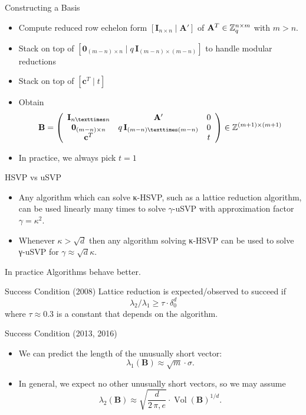 \documentclass[presentation,smaller]{beamer}
\renewcommand{\vec}[1]{\mathbf{#1}\xspace}
\DeclareMathOperator{\Vol}{Vol}
\begin{document}
\begin{frame}[label={sec:org4e52b51}]{Constructing a Basis}
\begin{itemize}
\item Compute reduced row echelon form \([\vec{I}_{n × n} \mid \vec{A}']\) of \(\vec{A}^T \in \ZZ_q^{n \times m}\) with \(m>n\).
\item Stack on top of \([\vec{0}_{(m-n) \times n} \mid q\,\vec{I}_{(m-n) × (m-n)}]\) to handle modular reductions
\item Stack on top of \([\vec{c}^T \mid t]\)
\item Obtain \[\vec{B}=\left(\begin{array}{ccc}
         \vec{I}_{n × n} & \vec{A}' &  0 \\
         \vec{0}_{(m-n) \times n} & q\,\vec{I}_{(m-n) × (m-n)} & 0\\
          \vec{c}^T  & & t \\
        \end{array} \right) \in \ZZ^{(m+1) \times (m+1)}\]
\item In practice, we always pick \(t=1\)
\end{itemize}
\end{frame}

\begin{frame}[label={sec:org14b043e}]{HSVP vs uSVP}
\begin{itemize}
\item Any algorithm which can solve κ-HSVP, such as a lattice reduction algorithm, can be used linearly many times to solve \(γ\)-uSVP with approximation factor \(γ=κ^2\).
\item Whenever \(κ > \sqrt{d}\) then any algorithm solving κ-HSVP can be used to solve γ-uSVP for \(γ ≈ \sqrt{d} κ\).
\end{itemize}

\pause

\begin{block}{In practice}
Algorithms behave better.
\end{block}
\end{frame}

\begin{frame}[label={sec:org9b3eedf}]{Success Condition (2008)}
Lattice reduction is expected/observed  to succeed if \[λ_2/λ_1 ≥ τ ⋅ δ_0^d\] where \(τ ≈ 0.3\) is a constant that depends on the algorithm.
\end{frame}

\begin{frame}[label={sec:org145ae5c}]{Success Condition (2013, 2016)}
\begin{itemize}
\item We can predict the length of the unusually short vector: \[λ_1(\vec{B}) ≈ \sqrt{m} ⋅ σ.\]

\item In general, we expect no other unusually short vectors, so we may assume  \[λ_2(\vec{B}) ≈ \sqrt{\frac{d}{2\,π,e}} ⋅ \Vol(\vec{B})^{1/d}.\]
\end{itemize}
\end{frame}
\end{document}
